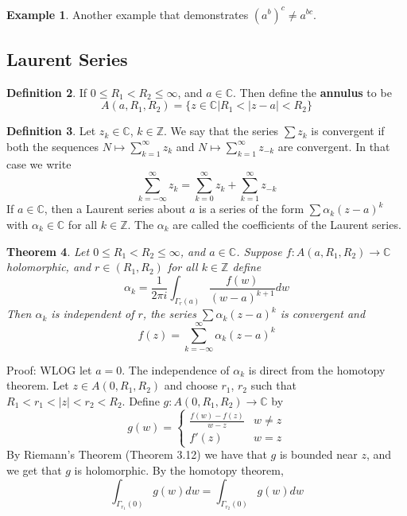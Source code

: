 \documentclass[11pt]{article}
\theoremstyle{plain}
\newtheorem{theorem}{Theorem}[section]
\theoremstyle{definition}
\newtheorem{definition}[theorem]{Definition}
\newtheorem{example}[theorem]{Example}
\newcommand{\C}{\mathbb{C}}
\newcommand{\Z}{\mathbb{Z}}
\begin{document}
\begin{example}
Another example that demonstrates $(a^b)^c \neq a^{bc}$.
\end{example}

\subsection{Laurent Series}

\begin{definition} 
If $0 \leq R_1 < R_2 \leq \infty$, and $a \in \C$. Then define the \textbf{annulus} to be 
$$ A(a, R_1, R_2) = \{ z \in \C | R_1 < |z - a| < R_2 \} $$
\end{definition}

\begin{definition}
Let $z_k \in \C$, $k \in \mathbb{Z}$. We say that the series $\sum z_k$ is convergent if both the sequences $N \mapsto \sum_{k=1}^{\infty} z_k$ and $N \mapsto \sum_{k=1}^{\infty} z_{-k}$ are convergent. In that case we write 
$$ \sum_{k = - \infty}^\infty z_k = \sum_{k=0}^\infty z_k + \sum_{k=1}^{\infty} z_{-k} $$
If $a \in \C$, then a Laurent series about $a$ is a series of the form $\sum \alpha_k (z-a)^k$ with $\alpha_k \in \C$ for all $k \in \Z$. The $\alpha_k$ are called the coefficients of the Laurent series. 
\end{definition}

\begin{theorem}
Let $0 \leq R_1 < R_2 \leq \infty$, and $a \in \C$. Suppose $f: A(a, R_1, R_2) \to \C$ holomorphic, and $r \in (R_1, R_2)$ for all $k \in \Z$ define 
$$ \alpha_k = \frac{1}{2\pi i} \int_{\Gamma_r(a)} \frac{f(w)}{(w-a)^{k+1}}dw $$
Then $\alpha_k$ is independent of $r$, the series $\sum \alpha_k (z - a)^k$ is convergent and 
$$ f(z) = \sum_{k=-\infty}^\infty \alpha_k (z - a)^k $$
\end{theorem}

Proof: WLOG let $a = 0$. The independence of $\alpha_k$ is direct from the homotopy theorem. Let $z \in A(0, R_1, R_2)$ and choose $r_1$, $r_2$ such that $R_1 < r_1 < |z| < r_2 < R_2$. Define $g:A(0, R_1, R_2) \to \C$ by 
$$ g(w) = \begin{cases} \frac{f(w) - f(z)}{w- z} & w \neq z \\ f'(z) & w = z \end{cases} $$
By Riemann's Theorem (Theorem 3.12) we have that $g$ is bounded near $z$, and we get that $g$ is holomorphic. By the homotopy theorem, 
$$ \int_{\Gamma_{r_1}(0)} g(w)dw = \int_{\Gamma_{r_2}(0)} g(w)dw $$
\end{document}
